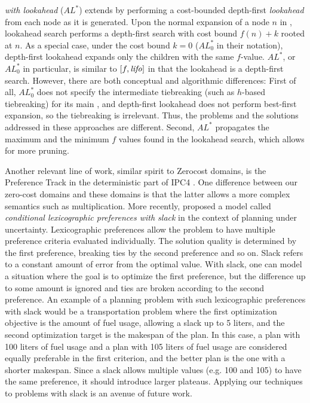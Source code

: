 \emph{\astar with lookahead} ($AL^*$) \cite{stern2010look} extends \astar by performing a cost-bounded depth-first \emph{lookahead} from each node as it is generated. Upon the normal expansion of a node $n$ in \astar, lookahead search performs a depth-first search with cost bound $f(n)+k$ rooted at $n$. As a special case, under the cost bound $k=0$ ($AL^*_0$ in their notation), depth-first lookahead expands only the children with the same $f$-value.
$AL^*$, or $AL^*_0$ in particular, is similar to $[f,{\text{\textit{lifo}}}]$ in that the lookahead is a depth-first search.
However, there are both conceptual and algorithmic differences: 
First of all, $AL^*_0$ does not specify the intermediate tiebreaking (such as $h$-based tiebreaking) for its main \astar, and depth-first lookahead does not perform best-first expansion, so the tiebreaking is irrelevant. Thus, the problems and the solutions addressed in these approaches are different.
Second, $AL^*$ propagates the maximum and the minimum $f$ values found in the lookahead search, which allows for more pruning.

Another relevant line of work, similar spirit to Zerocost domains, is the Preference Track in the deterministic
part of IPC4 \cite{gerevini2009automatically}. One difference between our zero-cost domains and these domains is
that the latter allows a more complex semantics such as multiplication.
% 
More recently,  \citeyear{wray2015multi} proposed a model called \emph{conditional lexicographic preferences with slack} in the context of planning under uncertainty. 
% 
Lexicographic preferences allow the problem to have multiple preference criteria evaluated individually. The
solution quality is determined by the first preference, breaking ties by the second preference and so on.
% 
Slack refers to a constant amount of error from the optimal value. With slack, one can model a situation where the
goal is to optimize the first preference, but the difference up to some amount is ignored and ties are broken according to 
the second preference.
% 
An example of a planning problem with such lexicographic preferences with slack would be a transportation problem where 
the first optimization objective is the amount of fuel usage, allowing a slack up to 5 liters, and 
the second optimization target is the makespan of the plan.
In this case, a plan with 100 liters of fuel usage and a plan with 105 liters of fuel usage are considered equally preferable in the first criterion, and the better plan is the one with a shorter makespan.
% 
Since a slack allows multiple values (e.g. 100 and 105) to have the same preference, it should introduce larger plateaus.
Applying our techniques to problems with slack is an avenue of future work.
